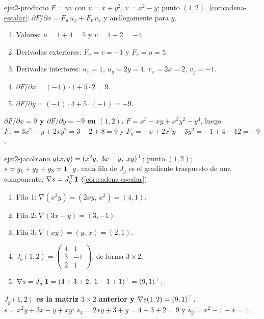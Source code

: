 \begin{solucion}{eje:2-producto}
\datos $F=uv$ con $u=x+y^{2}$, $v=x^{2}-y$; punto $(1,2)$.
\planteamiento \cref{cor:cadena-escalar}: $\partial F/\partial x=F_u\,u_x+F_v\,v_x$ y análogamente para $y$.
\pasos
\begin{enumerate}[label=\arabic*.]
  \item Valores: $u=1+4=5$ y $v=1-2=-1$.
  \item Derivadas exteriores: $F_u=v=-1$ y $F_v=u=5$.
  \item Derivadas interiores: $u_x=1$, $u_y=2y=4$, $v_x=2x=2$, $v_y=-1$.
  \item $\partial F/\partial x=(-1)\cdot 1+5\cdot 2=9$.
  \item $\partial F/\partial y=(-1)\cdot 4+5\cdot(-1)=-9$.
\end{enumerate}
\resultado \textbf{$\partial F/\partial x=9$ y $\partial F/\partial y=-9$ en $(1,2)$.}
\comprobacion $F=x^{3}-xy+x^{2}y^{2}-y^{3}$, luego $F_x=3x^{2}-y+2xy^{2}=3-2+8=9$ y $F_y=-x+2x^{2}y-3y^{2}=-1+4-12=-9$.
\end{solucion}

\begin{solucion}{eje:2-jacobiano}
\datos $g(x,y)=(x^{2}y,\;3x-y,\;xy)^{\top}$; punto $(1,2)$; $s=g_1+g_2+g_3=\mathbf{1}^{\top} g$.
\planteamiento cada fila de $J_g$ es el gradiente traspuesto de una componente; $\nabla s=J_g^{\top}\mathbf{1}$ (\cref{cor:cadena-escalar}).
\pasos
\begin{enumerate}[label=\arabic*.]
  \item Fila 1: $\nabla(x^{2}y)=(2xy,\,x^{2})=(4,1)$.
  \item Fila 2: $\nabla(3x-y)=(3,-1)$.
  \item Fila 3: $\nabla(xy)=(y,\,x)=(2,1)$.
  \item $J_g(1,2)=\begin{pmatrix}4&1\\3&-1\\2&1\end{pmatrix}$, de forma $3\times 2$.
  \item $\nabla s=J_g^{\top}\mathbf{1}=(4+3+2,\;1-1+1)^{\top}=(9,1)^{\top}$.
\end{enumerate}
\resultado \textbf{$J_g(1,2)$ es la matriz $3\times 2$ anterior y $\nabla s(1,2)=(9,1)^{\top}$.}
\comprobacion $s=x^{2}y+3x-y+xy$: $s_x=2xy+3+y=4+3+2=9$ y $s_y=x^{2}-1+x=1$.
\end{solucion}

